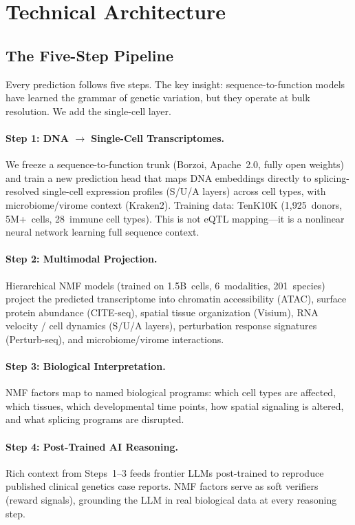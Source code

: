 \documentclass[10pt,twocolumn,letterpaper]{article}
\begin{document}
\section{Technical Architecture}
\label{sec:architecture}

\subsection{The Five-Step Pipeline}

Every prediction follows five steps. The key insight: sequence-to-function models
have learned the grammar of genetic variation, but they operate at bulk
resolution. We add the single-cell layer.

\paragraph{Step 1: DNA $\to$ Single-Cell Transcriptomes.} We freeze a
sequence-to-function trunk (Borzoi, Apache~2.0, fully open weights) and train a
new prediction head that maps DNA embeddings directly to splicing-resolved
single-cell expression profiles (S/U/A layers) across cell types, with
microbiome/virome context (Kraken2). Training data: TenK10K (1,925~donors,
5M+~cells, 28~immune cell types). This is not eQTL mapping---it is a nonlinear
neural network learning full sequence context.

\paragraph{Step 2: Multimodal Projection.} Hierarchical NMF models (trained on
1.5B~cells, 6~modalities, 201~species) project the predicted transcriptome into
chromatin accessibility (ATAC), surface protein abundance (CITE-seq), spatial
tissue organization (Visium), RNA velocity / cell dynamics (S/U/A layers),
perturbation response signatures (Perturb-seq), and microbiome/virome
interactions.

\paragraph{Step 3: Biological Interpretation.} NMF factors map to named
biological programs: which cell types are affected, which tissues, which
developmental time points, how spatial signaling is altered, and what splicing
programs are disrupted.

\paragraph{Step 4: Post-Trained AI Reasoning.} Rich context from Steps~1--3 feeds
frontier LLMs post-trained to reproduce published clinical genetics case reports.
NMF factors serve as soft verifiers (reward signals), grounding the LLM in real
biological data at every reasoning step.
\end{document}
